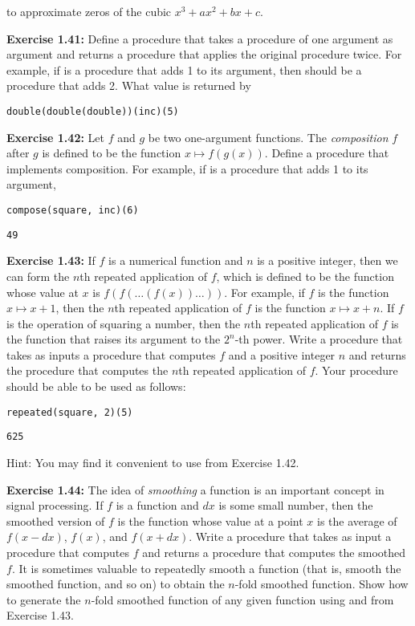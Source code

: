 to approximate zeros of the cubic $x^3 + ax^2 + bx + c$.

\textbf{Exercise 1.41:} Define a procedure  that takes a procedure of one argument as argument and returns a procedure that applies the original procedure twice. For example, if  is a procedure that adds 1 to its argument, then  should be a procedure that adds 2. What value is returned by

\begin{lstlisting}[style=slate]
double(double(double))(inc)(5)
\end{lstlisting}

\textbf{Exercise 1.42:} Let $f$ and $g$ be two one-argument functions. The \emph{composition} $f$ after $g$ is defined to be the function $x \mapsto f(g(x))$. Define a procedure  that implements composition. For example, if  is a procedure that adds 1 to its argument,

\begin{lstlisting}[style=slate]
compose(square, inc)(6)
\end{lstlisting}
\begin{verbatim}
49
\end{verbatim}

\textbf{Exercise 1.43:} If $f$ is a numerical function and $n$ is a positive integer, then we can form the $n$th repeated application of $f$, which is defined to be the function whose value at $x$ is $f(f(\ldots(f(x))\ldots))$. For example, if $f$ is the function $x \mapsto x + 1$, then the $n$th repeated application of $f$ is the function $x \mapsto x + n$. If $f$ is the operation of squaring a number, then the $n$th repeated application of $f$ is the function that raises its argument to the $2^n$-th power. Write a procedure that takes as inputs a procedure that computes $f$ and a positive integer $n$ and returns the procedure that computes the $n$th repeated application of $f$. Your procedure should be able to be used as follows:

\begin{lstlisting}[style=slate]
repeated(square, 2)(5)
\end{lstlisting}
\begin{verbatim}
625
\end{verbatim}

Hint: You may find it convenient to use  from Exercise 1.42.

\textbf{Exercise 1.44:} The idea of \emph{smoothing} a function is an important concept in signal processing. If $f$ is a function and $dx$ is some small number, then the smoothed version of $f$ is the function whose value at a point $x$ is the average of $f(x - dx)$, $f(x)$, and $f(x + dx)$. Write a procedure  that takes as input a procedure that computes $f$ and returns a procedure that computes the smoothed $f$. It is sometimes valuable to repeatedly smooth a function (that is, smooth the smoothed function, and so on) to obtain the $n$-fold smoothed function. Show how to generate the $n$-fold smoothed function of any given function using  and  from Exercise 1.43.

